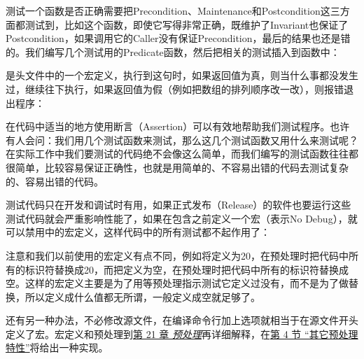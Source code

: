 测试一个函数是否正确需要把Precondition、Maintenance和Postcondition这三方面都测试到，比如这个函数，即使它写得非常正确，既维护了Invariant也保证了Postcondition，如果调用它的Caller没有保证Precondition，最后的结果也还是错的。我们编写几个测试用的Predicate函数，然后把相关的测试插入到函数中：





是头文件中的一个宏定义，执行到这句时，如果返回值为真，则当什么事都没发生过，继续往下执行，如果返回值为假（例如把数组的排列顺序改一改），则报错退出程序：




在代码中适当的地方使用断言（Assertion）可以有效地帮助我们测试程序。也许有人会问：我们用几个测试函数来测试，那么这几个测试函数又用什么来测试呢？在实际工作中我们要测试的代码绝不会像这么简单，而我们编写的测试函数往往都很简单，比较容易保证正确性，也就是用简单的、不容易出错的代码去测试复杂的、容易出错的代码。



测试代码只在开发和调试时有用，如果正式发布（Release）的软件也要运行这些测试代码就会严重影响性能了，如果在包含之前定义一个宏（表示No Debug），就可以禁用中的宏定义，这样代码中的所有测试都不起作用了：




注意和我们以前使用的宏定义有点不同，例如将定义为20，在预处理时把代码中所有的标识符替换成20，而把定义为空，在预处理时把代码中所有的标识符替换成空。这样的宏定义主要是为了用等预处理指示测试它定义过没有，而不是为了做替换，所以定义成什么值都无所谓，一般定义成空就足够了。



还有另一种办法，不必修改源文件，在编译命令行加上选项就相当于在源文件开头定义了宏。宏定义和预处理到\hyperlink{db.ch21.id2796862}{第 21 章 \emph{预处理}}再详细解释，在\hyperlink{db.ch21s04.id2799358}{第 4 节 “其它预处理特性”}将给出一种实现。



